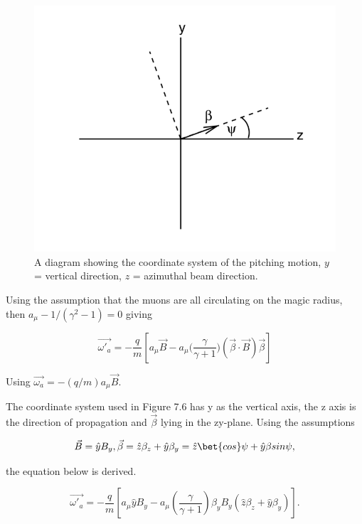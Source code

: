 \begin{figure}[th]
\centering
\includegraphics[scale=0.5]{Figures/pitcheffect.png}
\decoRule
\caption{A diagram showing the coordinate system of the pitching motion, $y$ = vertical direction, $z$ = azimuthal beam direction.}
\label{fig:pitcheffect.png}
\end{figure}

Using the assumption that the muons are all circulating on the magic radius, then $a_{\mu} - 1/(\gamma^{2}-1)=0 $ giving

\begin{equation}
\vec{\omega'_{a}}=-\frac{q}{m}[a_{\mu}\vec{B}-a_{\mu}\Big(\frac{\gamma}{\gamma+1}\Big)(\vec{\beta}\cdot\vec{B})\vec{\beta}]
\end{equation}

\noindent
Using $\vec{\omega_{a}}=-(q/m)a_{\mu}\vec{B}$. 

The coordinate system used in Figure 7.6 has y as the vertical axis, the z axis is the direction of propagation and $\vec{\beta}$ lying in the zy-plane. Using the assumptions

\begin{equation}
\vec{B}=\hat{y}B_{y}, \vec{\beta}=\hat{z}\beta_{z}+\hat{y}\beta_{y}=\hat{z}\bet {cos} \psi+\hat{y}\beta {sin} \psi, 
\end{equation}

\noindent
the equation below is derived.

\begin{equation}
\vec{\omega'_{a}} = - \frac{q}{m}[a_{\mu}\hat{y}B_{y}-a_{\mu}(\frac{\gamma}{\gamma + 1})\beta_{y}B_{y}(\hat{z}\beta_{z}+\hat{y}\beta_{y})].
\end{equation}

